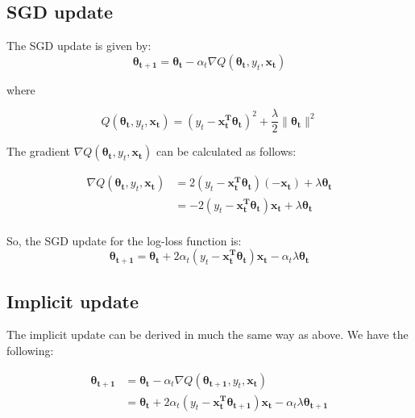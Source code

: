 \documentclass{article}
\renewcommand{\vec}[1]{\boldsymbol{#1}}
\begin{document}
\subsection{SGD update}

The SGD update is given by:
\begin{equation}
\vec{\theta_{t+1}} = \vec{\theta_{t}} - \alpha_{t}\nabla Q(\vec{\theta_{t}}, y_t, \vec{x_t})
\end{equation}

where

\begin{equation}
Q(\vec{\theta_{t}}, y_t, \vec{x_t}) = \left(y_t - \vec{x_t^T}\vec{\theta_t}\right)^2 + \frac{\lambda}{2}\|\vec{\theta_t}\|^2
\end{equation}

The gradient $\nabla Q(\vec{\theta_{t}}, y_t, \vec{x_t})$ can be calculated as follows:

\begin{align*}
\nabla Q(\vec{\theta_{t}}, y_t, \vec{x_t}) &= 2\left(y_t - \vec{x_t^T}\vec{\theta_t}\right)\left(-\vec{x_t}\right) + \lambda\vec{\theta_t}\\
&= -2(y_t-\vec{x_t^T}\vec{\theta_t})\vec{x_t} + \lambda\vec{\theta_t}\\
\end{align*}

So, the SGD update for the log-loss function is:
\begin{equation}
\vec{\theta_{t+1}} = \vec{\theta_{t}} +2 \alpha_{t}\left( y_t-\vec{x_t^T}\vec{\theta_t} \right )\vec{x_t} - \alpha_t\lambda\vec{\theta_t}
\end{equation}


\subsection{Implicit update}

The implicit update can be derived in much the same way as above. We have the following:

\begin{align*}
\vec{\theta_{t+1}} &= \vec{\theta_t} - \alpha_t \nabla Q(\vec{\theta_{t+1}}, y_t, \vec{x_t})\\
&= \vec{\theta_{t}} +2 \alpha_{t}\left( y_t-\vec{x_t^T}\vec{\theta_{t+1}} \right )\vec{x_t} - \alpha_t\lambda\vec{\theta_{t+1}}
\end{align*}
\end{document}
